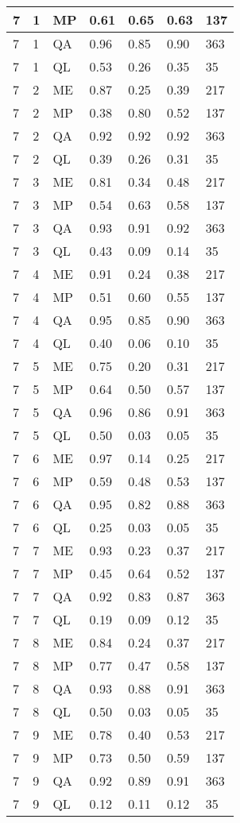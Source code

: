 \begin{table}[!ht]
\begin{tabularx}{300pt}{|X|X|X|X|X|X|X|}
\hline
7&1&MP&0.61&0.65&0.63&137\\
\hline
7&1&QA&0.96&0.85&0.90&363\\
\hline
7&1&QL&0.53&0.26&0.35&35\\
\hline
7&2&ME&0.87&0.25&0.39&217\\
\hline
7&2&MP&0.38&0.80&0.52&137\\
\hline
7&2&QA&0.92&0.92&0.92&363\\
\hline
7&2&QL&0.39&0.26&0.31&35\\
\hline
7&3&ME&0.81&0.34&0.48&217\\
\hline
7&3&MP&0.54&0.63&0.58&137\\
\hline
7&3&QA&0.93&0.91&0.92&363\\
\hline
7&3&QL&0.43&0.09&0.14&35\\
\hline
7&4&ME&0.91&0.24&0.38&217\\
\hline
7&4&MP&0.51&0.60&0.55&137\\
\hline
7&4&QA&0.95&0.85&0.90&363\\
\hline
7&4&QL&0.40&0.06&0.10&35\\
\hline
7&5&ME&0.75&0.20&0.31&217\\
\hline
7&5&MP&0.64&0.50&0.57&137\\
\hline
7&5&QA&0.96&0.86&0.91&363\\
\hline
7&5&QL&0.50&0.03&0.05&35\\
\hline
7&6&ME&0.97&0.14&0.25&217\\
\hline
7&6&MP&0.59&0.48&0.53&137\\
\hline
7&6&QA&0.95&0.82&0.88&363\\
\hline
7&6&QL&0.25&0.03&0.05&35\\
\hline
7&7&ME&0.93&0.23&0.37&217\\
\hline
7&7&MP&0.45&0.64&0.52&137\\
\hline
7&7&QA&0.92&0.83&0.87&363\\
\hline
7&7&QL&0.19&0.09&0.12&35\\
\hline
7&8&ME&0.84&0.24&0.37&217\\
\hline
7&8&MP&0.77&0.47&0.58&137\\
\hline
7&8&QA&0.93&0.88&0.91&363\\
\hline
7&8&QL&0.50&0.03&0.05&35\\
\hline
7&9&ME&0.78&0.40&0.53&217\\
\hline
7&9&MP&0.73&0.50&0.59&137\\
\hline
7&9&QA&0.92&0.89&0.91&363\\
\hline
7&9&QL&0.12&0.11&0.12&35\\

\end{tabularx}
\end{table}
